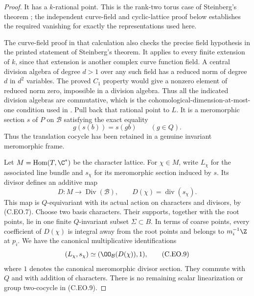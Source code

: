 \begin{proof}
It has a $k$-rational point. This is the
rank-two torus case of Steinberg's theorem
\cite[Theorem~1.9]{Steinberg1965}; the independent
curve-field and cyclic-lattice proof below
establishes the required vanishing for exactly
the representations used here.

The curve-field proof in that calculation also
checks the precise field hypothesis in the
printed statement of Steinberg's theorem.
It applies to every finite extension of $k$,
since that extension is another complex curve
function field. A central division algebra
of degree $d>1$ over any such field has a
reduced norm of degree $d$ in $d^2$ variables.
The proved $C_1$ property would give a nonzero
element of reduced norm zero, impossible in
a division algebra. Thus all the indicated
division algebras are commutative, which is
the cohomological-dimension-at-most-one
condition used in \cite[Theorem~1.9]{Steinberg1965}.
Pull back that rational point to $L$.
It is a meromorphic section $s$ of $P$ on
$\mathcal B$ satisfying the exact equality
\[
                         g(s(b))=s(gb)
                              \qquad(g\in Q).        \tag{C.EO.7}
\]
Thus the translation cocycle has been retained
in a genuine invariant meromorphic frame.

Let $M=\operatorname{Hom}(T,\C^*)$ be the
character lattice. For $\chi\in M$, write
$L_\chi$ for the associated line bundle and
$s_\chi$ for its meromorphic section induced
by $s$. Its divisor defines an additive map
\[
 D:M\longrightarrow\operatorname{Div}(\mathcal B),
       \qquad D(\chi)=\operatorname{div}(s_\chi).
                                                               \tag{C.EO.8}
\]
This map is $Q$-equivariant with its actual
action on characters and divisors, by (C.EO.7).
Choose two basis characters. Their supports,
together with the root points, lie in one
finite $Q$-invariant subset $\Sigma\subset B$.
In terms of coarse points, every coefficient
of $D(\chi)$ is integral away from the root
points and belongs to $m_i^{-1}\Z$ at $p_i$.
We have the canonical multiplicative
identifications
\[
          (L_\chi,s_\chi)
                   \simeq(\OO_{\mathcal B}(D(\chi)),1),
                                                               \tag{C.EO.9}
\]
where $1$ denotes the canonical meromorphic
divisor section. They commute with $Q$ and
with addition of characters. There is no
remaining scalar linearization or group
two-cocycle in (C.EO.9).


\end{proof}
